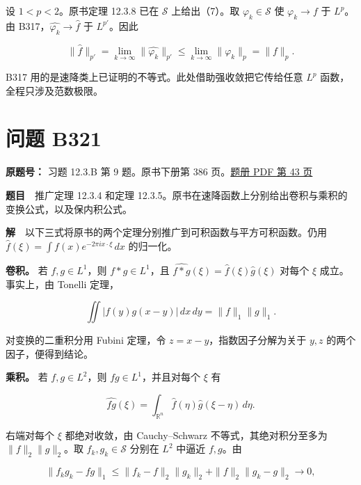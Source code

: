 \documentclass[11pt,a4paper]{article}
\begin{document}
设 \(1<p<2\)。原书定理 12.3.8 已在 \(\mathcal S\) 上给出（7）。取
\(\varphi_k\in\mathcal S\) 使 \(\varphi_k\to f\) 于 \(L^p\)。由
B317，\(\widehat{\varphi_k}\to\widehat f\) 于 \(L^{p'}\)。因此

\begin{equation}
\|\widehat f\|_{p'}
=\lim_{k\to\infty}\|\widehat{\varphi_k}\|_{p'}
\leq\lim_{k\to\infty}\|\varphi_k\|_p
=\|f\|_p .\tag{8}
\end{equation}

B317 用的是速降类上已证明的不等式。此处借助强收敛把它传给任意 \(L^p\)
函数，全程只涉及范数极限。

\section{问题 B321}\label{ux95eeux9898-b321}

\textbf{原题号：} 习题 12.3.B 第 9 题。原书下册第 386
页。\href{https://zj139.github.io/math-notes/files/problems/楼分析习题-v2.pdf\#page=43}{题册
PDF 第 43 页}

\textbf{题目}　推广定理 12.3.4 和定理
12.3.5。原书在速降函数上分别给出卷积与乘积的变换公式，以及保内积公式。

\textbf{解}　以下三式将原书的两个定理分别推广到可积函数与平方可积函数。仍用
\(\widehat f(\xi)=\int f(x)e^{-2\pi i x\cdot\xi}\,dx\) 的归一化。

\textbf{卷积。} 若 \(f,g\in L^1\)，则 \(f*g\in L^1\)，且
\(\widehat{f*g}(\xi)=\widehat f(\xi)\widehat g(\xi)\) 对每个 \(\xi\)
成立。事实上，由 Tonelli 定理，

\begin{equation}
\iint |f(y)g(x-y)|\,dx\,dy=\|f\|_1\|g\|_1 .\tag{9}
\end{equation}

对变换的二重积分用 Fubini 定理，令 \(z=x-y\)，指数因子分解为关于 \(y,z\)
的两个因子，便得到结论。

\textbf{乘积。} 若 \(f,g\in L^2\)，则 \(fg\in L^1\)，并且对每个 \(\xi\)
有

\begin{equation}
\widehat{fg}(\xi)=
\int_{\mathbb R^n}\widehat f(\eta)\widehat g(\xi-\eta)\,d\eta .\tag{10}
\end{equation}

右端对每个 \(\xi\) 都绝对收敛，由 Cauchy--Schwarz
不等式，其绝对积分至多为 \(\|f\|_2\|g\|_2\)。取 \(f_k,g_k\in\mathcal S\)
分别在 \(L^2\) 中逼近 \(f,g\)。由

\begin{equation}
\|f_kg_k-fg\|_1\leq
\|f_k-f\|_2\|g_k\|_2+\|f\|_2\|g_k-g\|_2\longrightarrow0,\tag{11}
\end{equation}
\end{document}
